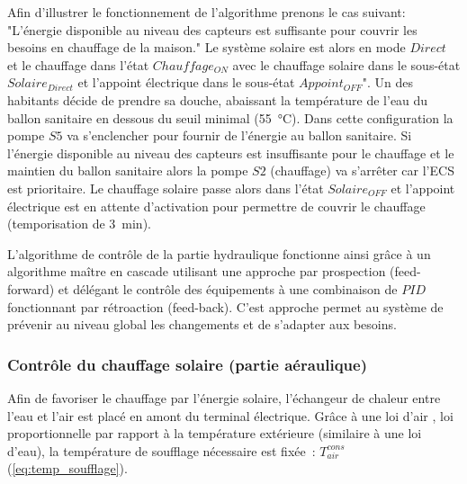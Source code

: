 Afin d’illustrer le fonctionnement de l’algorithme prenons le cas suivant: "L’énergie
disponible au niveau des capteurs est suffisante pour couvrir les besoins en chauffage de
la maison." Le système solaire est alors en mode $Direct$ et le chauffage dans l’état
$Chauffage_{ON}$ avec le chauffage solaire dans le sous-état $Solaire_{Direct}$ et
l’appoint électrique dans le sous-état $Appoint_{OFF}$". Un des habitants décide de
prendre sa douche, abaissant la température de l’eau du ballon sanitaire en dessous du
seuil minimal (\SI{55}{\celsius}). Dans cette configuration la pompe $S5$ va s’enclencher
pour fournir de l’énergie au ballon sanitaire. Si l’énergie disponible au niveau des
capteurs est insuffisante pour le chauffage et le maintien du ballon sanitaire alors la
pompe $S2$ (chauffage) va s’arrêter car l’ECS est prioritaire. Le chauffage solaire passe
alors dans l’état $Solaire_{OFF}$ et l’appoint électrique est en attente d’activation pour
permettre de couvrir le chauffage (temporisation de \SI{3}{\minute}).


L’algorithme de contrôle de la partie hydraulique fonctionne ainsi grâce à un algorithme
maître en cascade utilisant une approche par prospection (feed-forward) et délégant le
contrôle des équipements à une combinaison de $PID$ fonctionnant par rétroaction (feed-back).
C’est approche permet au système de prévenir au niveau global les changements et de
s’adapter aux besoins.


\subsubsection{Contrôle du chauffage solaire (partie aéraulique)} %
\label{ssub:controle_du_chauffage_solaire}
Afin de favoriser le chauffage par l’énergie solaire, l’échangeur de chaleur entre l’eau
et l’air est placé en amont du terminal électrique. Grâce à une loi d’air , loi
proportionnelle par rapport à la température extérieure (similaire à une loi d’eau), la
température de soufflage nécessaire est fixée~: $T_{air}^{cons}$ (\autoref{eq:temp_soufflage}).


